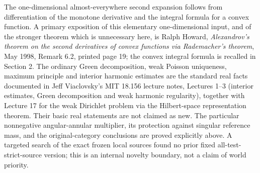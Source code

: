 The one-dimensional almost-everywhere second expansion follows
from differentiation of the monotone derivative and the integral
formula for a convex function. A primary exposition of this
elementary one-dimensional input, and of the stronger theorem
which is unnecessary here, is Ralph Howard,
\emph{Alexandrov's theorem on the second derivatives of convex
functions via Rademacher's theorem}, May 1998, Remark 6.2,
printed page 19; the convex integral formula is recalled in Section 2.
The ordinary Green decomposition, weak Poisson uniqueness, maximum
principle and interior harmonic estimates are the standard real
facts documented in Jeff Viaclovsky's MIT 18.156 lecture notes,
Lectures 1--3 (interior estimates, Green decomposition and weak
harmonic regularity), together with Lecture 17 for the weak
Dirichlet problem via the Hilbert-space representation theorem.
Their basic real statements are not claimed as new.
The particular nonnegative angular-annular multiplier, its protection against
singular reference mass, and the original-category conclusions are
proved explicitly above. A targeted search of the exact frozen
local sources found no prior fixed all-test-strict-source version;
this is an internal novelty boundary, not a claim of world priority.

